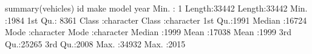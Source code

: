 \documentclass[
]{book}
\newenvironment{Shaded}{\begin{snugshade}}{\end{snugshade}}
\newcommand{\DecValTok}[1]{\textcolor[rgb]{0.00,0.00,0.81}{#1}}
\newcommand{\FunctionTok}[1]{\textcolor[rgb]{0.00,0.00,0.00}{#1}}
\newcommand{\NormalTok}[1]{#1}
\newcommand{\SpecialCharTok}[1]{\textcolor[rgb]{0.00,0.00,0.00}{#1}}
\begin{document}
\begin{Shaded}
\begin{Highlighting}[]
\FunctionTok{summary}\NormalTok{(vehicles)}
\NormalTok{       id            make              model                year     }
\NormalTok{ Min.   }\SpecialCharTok{:}    \DecValTok{1}\NormalTok{   Length}\SpecialCharTok{:}\DecValTok{33442}\NormalTok{       Length}\SpecialCharTok{:}\DecValTok{33442}\NormalTok{       Min.   }\SpecialCharTok{:}\DecValTok{1984}  
\NormalTok{ 1st Qu.}\SpecialCharTok{:} \DecValTok{8361}\NormalTok{   Class }\SpecialCharTok{:}\NormalTok{character   Class }\SpecialCharTok{:}\NormalTok{character   1st Qu.}\SpecialCharTok{:}\DecValTok{1991}  
\NormalTok{ Median }\SpecialCharTok{:}\DecValTok{16724}\NormalTok{   Mode  }\SpecialCharTok{:}\NormalTok{character   Mode  }\SpecialCharTok{:}\NormalTok{character   Median }\SpecialCharTok{:}\DecValTok{1999}  
\NormalTok{ Mean   }\SpecialCharTok{:}\DecValTok{17038}\NormalTok{                                         Mean   }\SpecialCharTok{:}\DecValTok{1999}  
\NormalTok{ 3rd Qu.}\SpecialCharTok{:}\DecValTok{25265}\NormalTok{                                         3rd Qu.}\SpecialCharTok{:}\DecValTok{2008}  
\NormalTok{ Max.   }\SpecialCharTok{:}\DecValTok{34932}\NormalTok{                                         Max.   }\SpecialCharTok{:}\DecValTok{2015}  
                                                                     

\end{Highlighting}
\end{Shaded}
\end{document}
